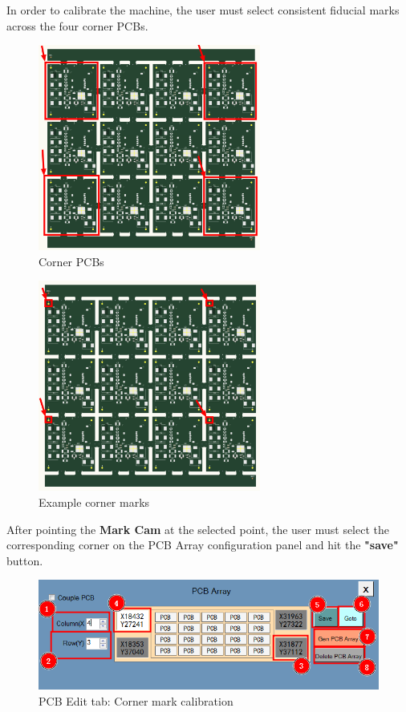 \documentclass[a4paper,10pt]{report}
\begin{document}
In order to calibrate the machine, the user must select consistent fiducial marks across the four corner PCBs.
\newpage
\begin{figure}[!htb]
 \centering
 \includegraphics[width=0.65\textwidth]{images/panel_mini_a4_corners.png}
 \caption{Corner PCBs}
\end{figure}
\begin{figure}[!htb]
 \centering
 \includegraphics[width=0.65\textwidth]{images/panel_mini_a4_marks.png}
 \caption{Example corner marks}
\end{figure}
\newpage
After pointing the \textbf{Mark Cam} at the selected point, the user must select the corresponding corner on the PCB Array configuration panel and hit the \textbf{"save"} button.
\begin{figure}[!htb]
 \centering
 \includegraphics[width=1\textwidth]{images/scrot11.png}
 \caption{PCB Edit tab: Corner mark calibration}
\end{figure}
\end{document}

